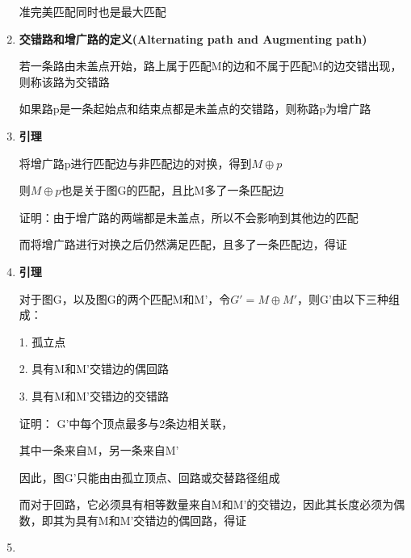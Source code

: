 \documentclass[UTF8]{ctexart}
\begin{document}
\begin{enumerate}
            准完美匹配同时也是最大匹配


      \item


            \textbf{交错路和增广路的定义(Alternating path and Augmenting path)}

            若一条路由未盖点开始，路上属于匹配M的边和不属于匹配M的边交错出现，则称该路为交错路

            如果路p是一条起始点和结束点都是未盖点的交错路，则称路p为增广路

            \vspace{1cm}

      \item

            \textbf{引理}

            将增广路p进行匹配边与非匹配边的对换，得到$M\oplus p$

            则$M\oplus p$也是关于图G的匹配，且比M多了一条匹配边

            证明：由于增广路的两端都是未盖点，所以不会影响到其他边的匹配

            而将增广路进行对换之后仍然满足匹配，且多了一条匹配边，得证

            \vspace{1cm}

      \item

            \textbf{引理}

            对于图G，以及图G的两个匹配M和M'，令$G'=M\oplus M'$，则G'由以下三种组成：

            1. 孤立点

            2. 具有M和M'交错边的偶回路

            3. 具有M和M'交错边的交错路

            \vspace{3cm}

            证明： G'中每个顶点最多与2条边相关联，

            其中一条来自M，另一条来自M'

            因此，图G'只能由由孤立顶点、回路或交替路径组成

            而对于回路，它必须具有相等数量来自M和M'的交错边，因此其长度必须为偶数，即其为具有M和M'交错边的偶回路，得证


            \vspace{2cm}


      \item



\end{enumerate}
\end{document}

